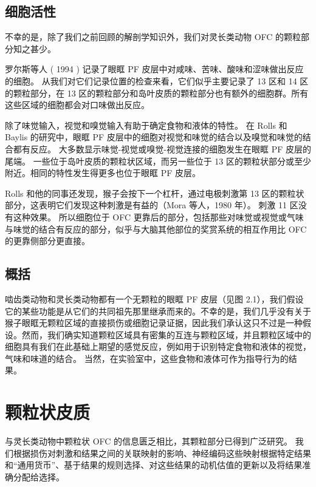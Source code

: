 \subsection{细胞活性}
不幸的是，除了我们之前回顾的解剖学知识外，我们对灵长类动物 OFC 的颗粒部分知之甚少。\par
罗尔斯等人 ( 1994 ) 记录了眼眶 PF 皮层中对咸味、苦味、酸味和涩味做出反应的细胞。 从我们对它们记录位置的检查来看，它们似乎主要记录了 13 区和 14 区的颗粒部分，在 13 区的颗粒部分和岛叶皮质的颗粒部分也有额外的细胞群。所有这些区域的细胞都会对口味做出反应。\par
除了味觉输入，视觉和嗅觉输入有助于确定食物和液体的特性。 在 Rolls 和 Baylis 的研究中，眼眶 PF 皮层中的细胞对视觉和味觉的结合以及嗅觉和味觉的结合都有反应。 大多数显示味觉-视觉或嗅觉-视觉连接的细胞发生在眼眶 PF 皮层的尾端。 一些位于岛叶皮质的颗粒状区域，而另一些位于 13 区的颗粒状部分或至少附近。相同的特性发生得更多也位于眼眶 PF 皮层。\par
Rolls 和他的同事还发现，猴子会按下一个杠杆，通过电极刺激第 13 区的颗粒状部分，这表明它们发现这种刺激是有益的（Mora 等人，1980 年）。 刺激 11 区没有这种效果。 所以细胞位于 OFC 更靠后的部分，包括那些对味觉或视觉或气味与味觉的结合有反应的部分，似乎与大脑其他部位的奖赏系统的相互作用比 OFC 的更靠侧部分更直接。\par
\subsection{概括}
啮齿类动物和灵长类动物都有一个无颗粒的眼眶 PF 皮层（见图 2.1），我们假设它的某些功能是从它们的共同祖先那里继承而来的。不幸的是，我们几乎没有关于猴子眼眶无颗粒区域的直接损伤或细胞记录证据，因此我们承认这只不过是一种假设。然而，我们确实知道颗粒区域具有密集的互连与颗粒区域，并且颗粒区域中的细胞具有我们在此基础上期望的感觉反应，例如用于识别特定食物和液体的视觉，气味和味道的结合。 当然，在实验室中，这些食物和液体可作为指导行为的结果。\par
\section{颗粒状皮质}
与灵长类动物中颗粒状 OFC 的信息匮乏相比，其颗粒部分已得到广泛研究。 我们根据损伤对刺激和结果之间的关联映射的影响、神经编码这些映射根据特定结果和“通用货币”、基于结果的规则选择、对这些结果的动机估值的更新以及将结果准确分配给选择。
